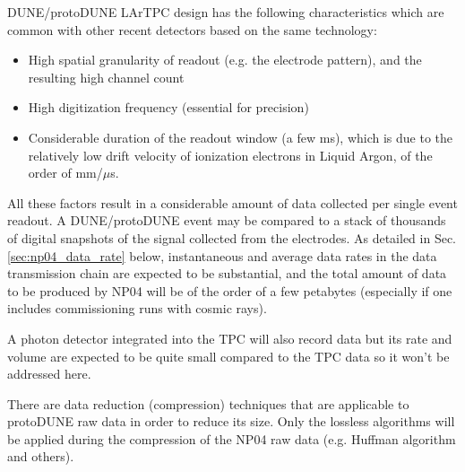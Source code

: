 \documentclass[a4paper]{jpconf}
\newcommand{\pd}{protoDUNE\xspace}
\begin{document}
DUNE/\pd LArTPC design has the following characteristics which are common with
other recent detectors based on the same technology:
\begin{itemize}
\item High spatial granularity of readout (e.g. the electrode pattern), and the resulting high channel count
\item High digitization frequency (essential for precision)
\item Considerable duration of the readout window (a few ms), which is due to the relatively
low drift velocity of ionization electrons in Liquid Argon, of the order of mm/$\mu$s.
\end{itemize}

\noindent All these factors result in a considerable amount of data collected per single event readout.
A DUNE/\pd event may be compared to a stack of thousands of digital  snapshots of the signal
collected from the electrodes.  As detailed in Sec.\,\ref{sec:np04_data_rate} below,
instantaneous and average data rates in the data transmission chain are expected to be substantial, 
and the total amount of data to be produced by NP04 will be of the order of a few
petabytes (especially if one includes commissioning runs with cosmic rays).

A photon detector integrated into the TPC will also record data but its rate and volume are
expected to be quite small compared to the TPC data so it won't be addressed here.

There are data reduction (compression) techniques that are applicable to \pd raw data in order to reduce its size. 
Only the lossless algorithms will be applied during the compression of the NP04 raw data
(e.g. Huffman algorithm and others).
\end{document}
